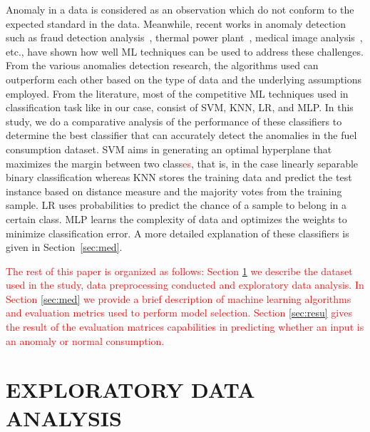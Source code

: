 \documentclass[a4paper,fleqn]{cas-dc}
\newcommand\mycorrections[1]{\textcolor{red}{#1}}
\begin{document}
Anomaly in a data is considered as an observation which do not conform to the expected standard in the data. Meanwhile, recent works in anomaly detection such as fraud detection analysis~\citep{2017arXiv170601953Z, chouiekh2018convnets}, 
thermal power plant~\citep{banjanovic2017neural}, medical image analysis~\citep{taboada2009anomaly}, etc., have shown how well ML techniques can be used to address these challenges.
From the various anomalies detection research, the algorithms used can outperform each other based on the type of data 
and the underlying assumptions employed. From the literature, most of the competitive ML techniques used in classification task like in our case, consist of SVM, KNN, LR, and MLP. In this study, we do a comparative analysis of the performance of these classifiers to determine the best classifier that can accurately detect the anomalies in the fuel consumption dataset. SVM aims in generating an optimal hyperplane that maximizes the margin between two class\mycorrections{es}, that is, in the case linearly separable binary classification whereas KNN  stores the training data and predict the test instance based on distance measure and the majority votes from the training sample. LR uses probabilities to predict the chance of a sample to belong in a certain class. MLP learns the complexity of data and optimizes the weights to minimize classification error. A more detailed explanation of these classifiers is given in Section~\ref{sec:med}.


\mycorrections{The rest of this paper is organized as follows: Section \ref{sec:expl} we describe the dataset used in the study, data preprocessing conducted and exploratory data analysis. In Section \ref{sec:med} we provide a brief description of machine learning algorithms and evaluation metrics used to perform model selection. Section \ref{sec:resu} gives the result of the evaluation matrices capabilities in predicting whether an input is an anomaly or normal consumption.}



\section{EXPLORATORY DATA ANALYSIS}  \label{sec:expl}
\end{document}
